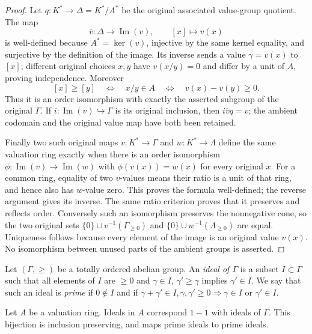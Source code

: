 \begin{proof}
Let $q:K^*\to\Delta=K^*/A^*$
be the original associated
value-group quotient. The map
$$
\overline v:\Delta\longrightarrow\operatorname{Im}(v),
\qquad[x]\longmapsto v(x)
$$
is well-defined because
$A^*=\ker(v)$, injective
by the same kernel equality,
and surjective by the
definition of the image.
Its inverse sends a value
$\gamma=v(x)$ to $[x]$;
different original choices
$x,y$ have $v(x/y)=0$
and differ by a unit of
$A$, proving independence.
Moreover
$$
[x]\geq[y]\quad\Longleftrightarrow\quad
x/y\in A\quad\Longleftrightarrow\quad
v(x)-v(y)\geq0.
$$
Thus it is an order
isomorphism with exactly
the asserted subgroup of
the original $\Gamma$.
If $i:\operatorname{Im}(v)\hookrightarrow\Gamma$
is its original inclusion,
then $i\overline vq=v$;
the ambient codomain and
the original value map
have both been retained.

Finally two such original
maps $v:K^*\to\Gamma$ and
$w:K^*\to\Lambda$ define
the same valuation ring
exactly when there is an
order isomorphism
$\phi:\operatorname{Im}(v)\to\operatorname{Im}(w)$
with $\phi(v(x))=w(x)$
for every original $x$.
For a common ring, equality
of two $v$-values means
their ratio is a unit
of that ring, and hence
also has $w$-value zero.
This proves the formula
well-defined; the reverse
argument gives its inverse.
The same ratio criterion
proves that it preserves
and reflects order. Conversely
such an isomorphism preserves
the nonnegative cone, so
the two original sets
$\{0\}\cup v^{-1}(\Gamma_{\geq0})$
and $\{0\}\cup w^{-1}(\Lambda_{\geq0})$
are equal. Uniqueness follows
because every element of
the image is an original
value $v(x)$. No isomorphism
between unused parts of the
ambient groups is asserted.
\end{proof}

\noindent
Let $(\Gamma, \geq)$ be a totally ordered abelian group.
An {\it ideal of $\Gamma$} is a subset $I \subset \Gamma$ such
that all elements of $I$ are $\geq 0$ and $\gamma \in I$,
$\gamma' \geq \gamma$ implies $\gamma' \in I$. We say that such
an ideal is {\it prime} if $0 \not \in I$ and if
$\gamma + \gamma' \in I, \gamma, \gamma' \geq 0
\Rightarrow \gamma \in I \text{ or } \gamma' \in I$.

\begin{lemma}
\label{lemma-ideals-valuation-ring}
Let $A$ be a valuation ring.
Ideals in $A$ correspond $1 - 1$ with ideals of $\Gamma$.
This bijection is inclusion preserving, and maps prime
ideals to prime ideals.
\end{lemma}

